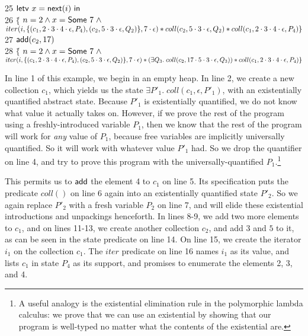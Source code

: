 \documentclass[preprint,natbib]{sigplanconf}
\begin{document}
{\begin{tabbing}
25 \> $\mbox{\textsf{{letv }}}x = \mbox{\textsf{{next}}}(i)\mbox{\textsf{{ in }}}$ \\
26 \> $\{$\= $n = 2 \land x = \mbox{\textsf{{Some }}}7 \;\land $\\
\> \> $iter(i, \{{(c_1, 2\cdot3\cdot4\cdot\epsilon, P_4), (c_2, 5\cdot3\cdot\epsilon, Q_2)}\}, 7\cdot\epsilon) * coll(c_2, 5\cdot3\cdot\epsilon, Q_2) * coll(c_1, 2\cdot3\cdot4\cdot\epsilon, P_4)\}$ \\
27 \> $\mbox{\textsf{{add}}}(c_2, 17)$ \\
28 \> $\{$\= $n = 2 \land x = \mbox{\textsf{{Some }}}7 \;\land $\\
\> \> $iter(i, \{{(c_1, 2\cdot3\cdot4\cdot\epsilon, P_4), (c_2, 5\cdot3\cdot\epsilon, Q_2)}\}, 7\cdot\epsilon) * 
(\exists Q_3.\; coll(c_2, 17\cdot5\cdot3\cdot\epsilon, Q_3)) * coll(c_1, 2\cdot3\cdot4\cdot\epsilon, P_4)\}$ \\
\end{tabbing}
}
In line 1 of this example, we begin in an empty heap. In line 2, we
create a new collection $c_1$, which yields us the state $\exists
P'_1.\; coll(c_1, \epsilon, P'_1)$, with an existentially quantified
abstract state.
%
Because $P'_1$ is existentially quantified, we do not know what value
it actually takes on. However, if we prove the rest of the program
using a freshly-introduced variable $P_1$, then we know that the rest
of the program will work for \emph{any} value of $P_1$, because free
variables are implicitly universally quantified.  So it will work with
whatever value $P'_1$ had. So we drop the quantifier on line 4, and
try to prove this program with the universally-quantified
$P_1$.\footnote{A useful analogy is the existential elimination rule
  in the polymorphic lambda calculus: we prove that we can use an
  existential by showing that our program is well-typed no matter what
  the contents of the existential are.}

This permits us to $\mbox{\textsf{{add}}}$ the element 4 to $c_1$ on line 5. Its
specification puts the predicate $coll()$ on line 6 again into an
existentially quantified state $P'_2$. So we again replace $P'_2$ with
a fresh variable $P_2$ on line 7, and will elide these existential
introductions and unpackings henceforth.
%
In lines 8-9, we add two more elements to $c_1$, and on lines 11-13,
we create another collection $c_2$, and add $3$ and $5$ to it, as can
be seen in the state predicate on line 14. On line 15, we create the
iterator $i_1$ on the collection $c_1$. The $iter$ predicate on line
16 names $i_1$ as its value, and lists $c_1$ in state $P_4$ as its
support, and promises to enumerate the elements 2, 3, and 4.
\end{document}
